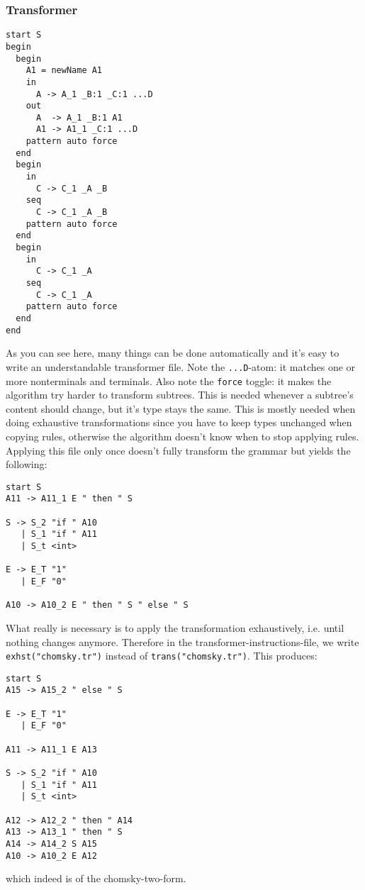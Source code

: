 \documentclass[a4paper]{article}
\begin{document}
\subsubsection*{Transformer}
\begin{lstlisting}[language=transformer]
start S
begin
  begin
    A1 = newName A1
    in
      A -> A_1 _B:1 _C:1 ...D 
    out 
      A  -> A_1 _B:1 A1  
      A1 -> A1_1 _C:1 ...D
    pattern auto force
  end
  begin
    in
      C -> C_1 _A _B
    seq
      C -> C_1 _A _B
    pattern auto force
  end
  begin
    in
      C -> C_1 _A
    seq
      C -> C_1 _A
    pattern auto force
  end
end
\end{lstlisting}
As you can see here, many things can be done automatically and it's easy to write an understandable transformer file. Note the \verb|...D|-atom: it matches one or more nonterminals and terminals. Also note the \verb|force| toggle: it makes the algorithm try harder to transform subtrees. This is needed whenever a subtree's content should change, but it's type stays the same. This is mostly needed when doing exhaustive transformations since you have to keep types unchanged when copying rules, otherwise the algorithm doesn't know when to stop applying rules.\\
Applying this file only once doesn't fully transform the grammar but yields the following:
\begin{lstlisting}[language=grammar]
start S
A11 -> A11_1 E " then " S

S -> S_2 "if " A10
   | S_1 "if " A11
   | S_t <int>

E -> E_T "1"
   | E_F "0"

A10 -> A10_2 E " then " S " else " S
\end{lstlisting}
What really is necessary is to apply the transformation exhaustively, i.e. until nothing changes anymore. Therefore in the transformer-instructions-file, we write \verb|exhst("chomsky.tr")| instead of \verb|trans("chomsky.tr")|. This produces:
\begin{lstlisting}[language=grammar]
start S
A15 -> A15_2 " else " S

E -> E_T "1"
   | E_F "0"

A11 -> A11_1 E A13

S -> S_2 "if " A10
   | S_1 "if " A11
   | S_t <int>

A12 -> A12_2 " then " A14
A13 -> A13_1 " then " S
A14 -> A14_2 S A15
A10 -> A10_2 E A12
\end{lstlisting}
which indeed is of the chomsky-two-form.
\end{document}
